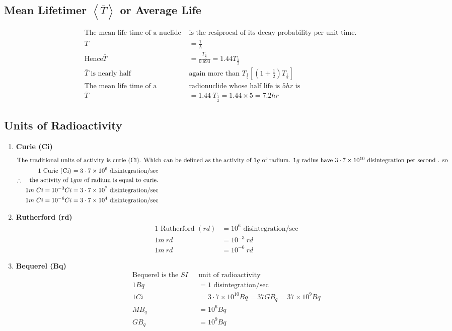 \subsection{Mean Lifetimer $\left\langle \bar{T}\right\rangle $ or Average Life }
\begin{align*}
\text{The mean life time of a nuclide }&\text{is the resiprocal of its decay probability per unit time.}\\
\bar{T}&=\frac{1}{\lambda}\\
\text{Hence}
\bar{T}&=\frac{T_\frac{1}{2}}{0.693}=1.44 T_\frac{1}{2}\\
\text{$\bar{T}$ is nearly half }&\text{again more than $T_{\frac{1}{2}}\left[\left(1+\frac{1}{2}\right) T_\frac{1}{2}\right]$}\\
\text{The mean life time of a }&\text{radionuclide whose half life is $5 hr$ is}\\
\bar{T}&=1.44 \ T_{\frac{1}{2}}=1.44 \times 5=7.2 hr
\end{align*}
\subsection{Units of Radioactivity}
\begin{enumerate}
	\item \textbf{ Curie (Ci)}
	\begin{align*}
	\intertext{The traditional units of activity is curie (Ci). Which can be defined as the activity of $1g$ of radium. $1g$ radius have $3\cdot7 \times 10^{10}$ disintegration per second . so}
	\text{$1 $  Curie (Ci) $=3\cdot7\times10^6$ disintegration/sec}\\
	\text{$\therefore$ \quad the activity of $1gm$ of radium is equal to curie.}\\
	\text{$1m \ Ci=10^{-3} Ci=3\cdot 7 \times 10^7 $ disintegration/sec}\\
	\text{$1m \ Ci=10^{-6} Ci=3\cdot 7 \times 10^4 $ disintegration/sec}
	\end{align*}
	\item \textbf{Rutherford (rd)}
	\begin{align*}
	1 \text{ Rutherford } (rd) &= 10^6 \text{ disintegration/sec}\\
	1 m\  rd&=10^{-3}\  rd\\
	1 m\  rd&=10^{-6}\  rd
	\end{align*}
	\item \textbf{Bequerel (Bq)}
	\begin{align*}
	\text{Bequerel is the $SI$ }&\text{unit of radioactivity}\\
	1 Bq&=1 \text{ disintegration/sec}\\
	1Ci&=3\cdot7\times10^{10}Bq =37GB_q=37\times10^9Bq\\
	MB_q&=10^6Bq\\
	GB_q&=10^9Bq
	\end{align*}
\end{enumerate}
